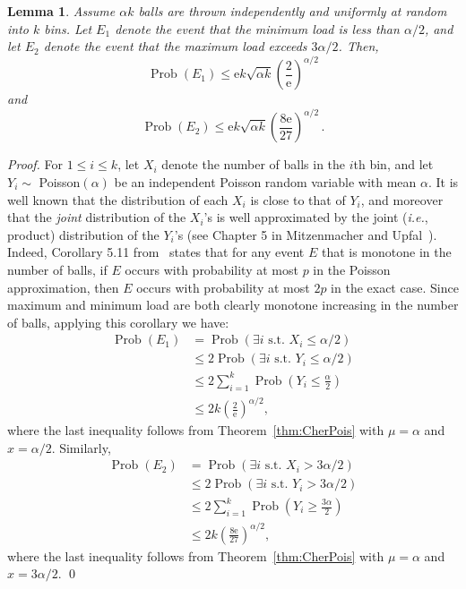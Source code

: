 \documentclass[11pt,letter]{article}
\newcommand{\ie}{\emph{i.e.}}
\newcommand{\e}{\mathrm{e}}
\DeclareMathOperator*{\Prob}{Prob}
\theoremstyle{mytheoremstyle}
\newtheorem{lemma}{Lemma}
\newcommand{\bins}{k}
\begin{document}
\begin{lemma} \label{lem:ballsnbins}
	Assume $\alpha \bins$ balls are thrown independently and uniformly at random into $\bins$ bins. Let $E_1$ denote the event that the minimum load is less than $\alpha/2$, and let $E_2$ denote the event that the maximum load exceeds $3\alpha/2$. Then,
	\begin{equation}\label{eqn:bb-low}
	\Prob (E_1) \le \e\bins\sqrt{\alpha \bins}
	\left(\frac2{\e}\right)^{\alpha/2}
	\end{equation}
	and
	\begin{equation}\label{eqn:bb-high}
	\Prob (E_2) \le \e\bins\sqrt{\alpha \bins}
	\left(\frac{8\e}{27}\right)^{\alpha/2}\,.
	\end{equation}
\end{lemma}
\begin{proof}
	For $1\le i \le \bins$, let $X_i$ denote the number of balls in the $i$th bin, and let $Y_i \sim$ Poisson$(\alpha)$ be an independent Poisson random variable with mean $\alpha$. It is well known that the distribution of each $X_i$ is close to that of $Y_i$, and moreover that the
	\emph{joint} distribution of the $X_i$'s is well approximated by the joint (\ie, product) distribution of the $Y_i$'s (see Chapter 5 in Mitzenmacher and Upfal~\cite{opac-b1117540}). Indeed, Corollary 5.11 from~\cite{opac-b1117540} states that for any event $E$ that is monotone in the number of balls, if $E$ occurs with probability at most $p$ in the Poisson approximation, then $E$ occurs with probability at most $2p$ in the exact case. Since maximum and minimum load are both clearly monotone increasing in the number of balls, applying this corollary we have:
	\begin{align*}
		\Prob(E_1)&= \Prob\left(\exists i \mbox{ s.t. } X_i \le \alpha/2\right) \\
		& \le 2\Prob\left(\exists i \mbox{ s.t. } Y_i \le
		\alpha/2\right)\\
		&\le 2 \sum_{i=1}^{\bins}
		\Prob\left(Y_i \le \frac{\alpha}{2}\right) \\
		&\le 2 \bins\left(\frac{2}{\e}\right)^{\alpha/2},
	\end{align*}
	where the last inequality follows from Theorem~\ref{thm:CherPois} with $\mu = \alpha$ and $x = \alpha/2$.
	Similarly,
	\begin{align*}
		\Prob(E_2)&= \Prob\left(\exists i \mbox{ s.t. } X_i > 3\alpha/2\right) \\
		&\le 2 \Prob\left(\exists i \mbox{ s.t. } Y_i >
		3\alpha/2\right)\\
		&\le 2 \sum_{i=1}^{\bins}
		\Prob\left(Y_i \ge \frac{3\alpha}{2}\right) \\
		&\le 2\bins \left(\frac{8\e}{27}\right)^{\alpha/2},
	\end{align*}
	where the last inequality follows from Theorem~\ref{thm:CherPois} with $\mu = \alpha$ and $x = 3\alpha/2$.
	\qed
\end{proof}
\end{document}
